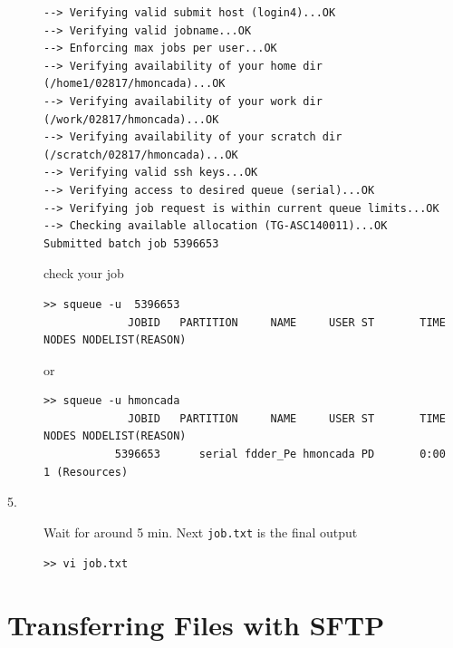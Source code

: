 \documentclass{article}
\begin{document}
\begin{description}
\begin{verbatim}
--> Verifying valid submit host (login4)...OK
--> Verifying valid jobname...OK
--> Enforcing max jobs per user...OK
--> Verifying availability of your home dir (/home1/02817/hmoncada)...OK
--> Verifying availability of your work dir (/work/02817/hmoncada)...OK
--> Verifying availability of your scratch dir (/scratch/02817/hmoncada)...OK
--> Verifying valid ssh keys...OK
--> Verifying access to desired queue (serial)...OK
--> Verifying job request is within current queue limits...OK
--> Checking available allocation (TG-ASC140011)...OK
Submitted batch job 5396653
\end{verbatim}
\normalsize
check your job
\scriptsize
\begin{verbatim}
>> squeue -u  5396653
             JOBID   PARTITION     NAME     USER ST       TIME  NODES NODELIST(REASON)
\end{verbatim}
\normalsize
or
\scriptsize
\begin{verbatim}
>> squeue -u hmoncada
             JOBID   PARTITION     NAME     USER ST       TIME  NODES NODELIST(REASON)
           5396653      serial fdder_Pe hmoncada PD       0:00      1 (Resources)
\end{verbatim}
\normalsize          

\item [5.] Wait for around 5 min. Next \verb+job.txt+ is the final output 
\scriptsize
\begin{verbatim}
>> vi job.txt
\end{verbatim}
\normalsize
\end{description}
\section{Transferring Files with SFTP}
\end{document}
